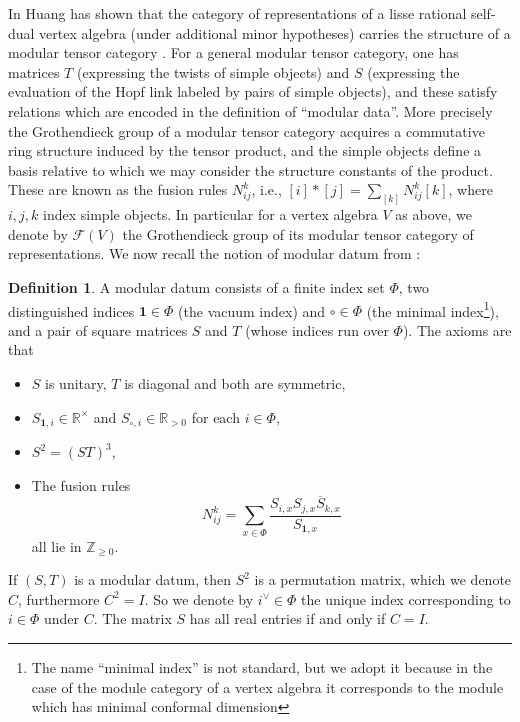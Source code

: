 \documentclass[12pt]{amsart}
\theoremstyle{plain}
\theoremstyle{definition}
\newtheorem{defn}[thm]{Definition}%
\numberwithin{equation}{section}
\newcommand{\R}{\mathbb{R}}
\newcommand{\Z}{\mathbb{Z}}
\newcommand{\CF}{\mathcal{F}}
\newcommand{\vac}{\mathbf{1}}
\newcommand{\ov}[1]{\overline#1}
\begin{document}
In \cite{Huang-rigidity} Huang has shown that the category of representations of a lisse rational self-dual vertex algebra (under additional minor hypotheses) carries the structure of a modular tensor category \cite{MS89, EGNO, BakKir}. For a general modular tensor category, one has matrices $T$ (expressing the twists of simple objects) and $S$ (expressing the evaluation of the Hopf link labeled by pairs of simple objects), and these satisfy relations which are encoded in the definition of ``modular data''. More precisely the Grothendieck group of a modular tensor category acquires a commutative ring structure induced by the tensor product, and the simple objects define a basis relative to which we may consider the structure constants of the product. These are known as the fusion rules $N_{ij}^k$, i.e., $[i] * [j] = \sum_{[k]} N^{k}_{ij} [k]$, where $i, j, k$ index simple objects. In particular for a vertex algebra $V$ as above, we denote by $\CF(V)$ the Grothendieck group of its modular tensor category of representations. We now recall the notion of modular datum from \cite[Definition 2.1]{GM}:
\begin{defn}
A modular datum consists of a finite index set $\Phi$, two distinguished indices $\vac \in \Phi$ (the vacuum index) and $\circ \in \Phi$ (the minimal index\footnote{The name ``minimal index'' is not standard, but we adopt it because in the case of the module category of a vertex algebra it corresponds to the module which has minimal conformal dimension}), and a pair of square matrices $S$ and $T$ (whose indices run over $\Phi$). The axioms are that
\begin{itemize}
\item $S$ is unitary, $T$ is diagonal and both are symmetric,

\item $S_{\vac, i} \in \R^\times$ and $S_{\circ, i} \in \R_{> 0}$ for each $i \in \Phi$,

\item $S^2 = (ST)^3$,

\item The fusion rules
\[
N_{ij}^k = \sum_{x \in \Phi} \frac{S_{i, x} S_{j, x} \ov{S}_{k, x} }{S_{\vac, x}}
\]
all lie in $\Z_{\geq 0}$.
\end{itemize}
\end{defn}

If $(S, T)$ is a modular datum, then $S^2$ is a permutation matrix, which we denote $C$, furthermore $C^2 = I$. So we denote by $i^\vee \in \Phi$ the unique index corresponding to $i \in \Phi$ under $C$. The matrix $S$ has all real entries if and only if $C = I$.
\end{document}
